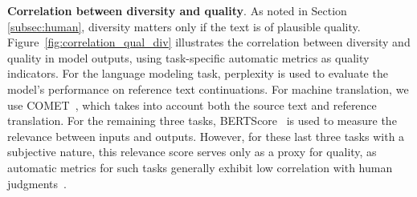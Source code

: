 \documentclass[11pt,a4paper]{article}
\begin{document}
\smallskip
\noindent\textbf{Correlation between diversity and quality}.
As noted in Section \ref{subsec:human}, diversity matters only if the text is of plausible quality.
Figure~\ref{fig:correlation_qual_div} illustrates the correlation between diversity and quality in model outputs, using task-specific automatic metrics as quality indicators. For the language modeling task, perplexity is used to evaluate the model's performance on reference text continuations. For machine translation, we use COMET~\citep{rei-etal-2020-comet}, which takes into account both the source text and reference translation. For the remaining three tasks, BERTScore~\citep{bert-score} is used to measure the relevance between inputs and outputs. However, for these last three tasks with a subjective nature, this relevance score serves only as a proxy for quality, as automatic metrics for such tasks generally exhibit low correlation with human judgments~\citep{10.1162/tacl_a_00689, liu-etal-2023-g}.


\end{document}

